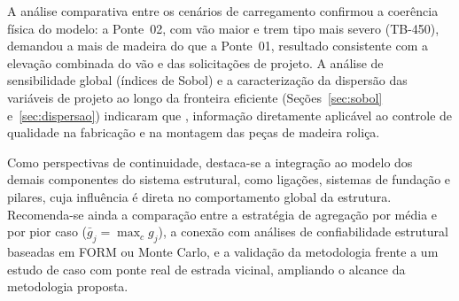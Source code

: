 A análise comparativa entre os cenários de carregamento confirmou a coerência física do modelo: a Ponte~02, com vão maior e trem tipo mais severo (TB-450), demandou  a mais de madeira do que a Ponte~01, resultado consistente com a elevação combinada do vão e das solicitações de projeto. A análise de sensibilidade global (índices de Sobol) e a caracterização da dispersão das variáveis de projeto ao longo da fronteira eficiente (Seções~\ref{sec:sobol} e~\ref{sec:dispersao}) indicaram que , informação diretamente aplicável ao controle de qualidade na fabricação e na montagem das peças de madeira roliça.

Como perspectivas de continuidade, destaca-se a integração ao modelo dos demais componentes do sistema estrutural, como ligações, sistemas de fundação e pilares, cuja influência é direta no comportamento global da estrutura. Recomenda-se ainda a comparação entre a estratégia de agregação por média e por pior caso ($\bar{g}_j = \max_c g_j$), a conexão com análises de confiabilidade estrutural baseadas em FORM ou Monte Carlo, e a validação da metodologia frente a um estudo de caso com ponte real de estrada vicinal, ampliando o alcance da metodologia proposta.
